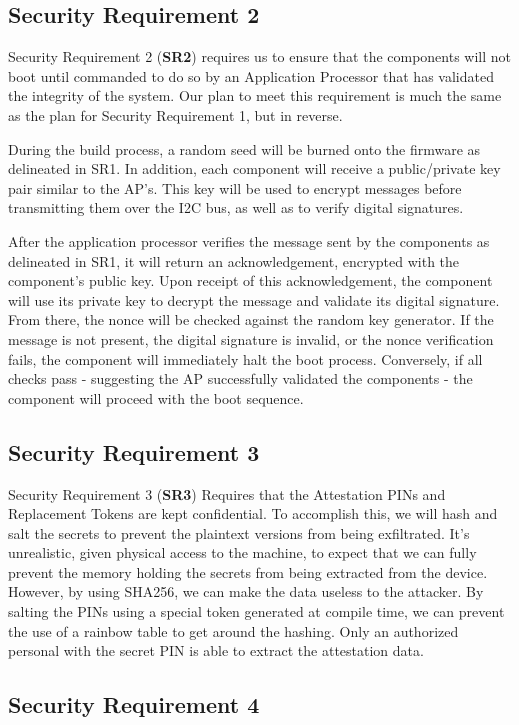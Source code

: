 \documentclass{prace}
\begin{document}
\subsection{Security Requirement 2}
Security Requirement 2 (\textbf{SR2}) requires us to ensure that the components will not boot until commanded
to do so by an Application Processor that has validated the integrity of the system. Our plan to
meet this requirement is much the same as the plan for Security Requirement 1, but in reverse.

During the build process, a random seed will be burned onto the firmware as delineated in 
SR1. In addition, each component will receive a public/private key pair similar to the AP's.
This key will be used to encrypt messages before transmitting them over the I2C bus, as well
as to verify digital signatures.

After the application processor verifies the message sent by the components as delineated
in SR1, it will return an acknowledgement, encrypted with the component's public key. Upon
receipt of this acknowledgement, the component will use its private key to decrypt the 
message and validate its digital signature. From there, the nonce will be checked against
the random key generator. If the message is not present, the digital signature is invalid,
or the nonce verification fails, the component will immediately halt the boot process.
Conversely, if all checks pass - suggesting the AP successfully validated the components -
the component will proceed with the boot sequence.

\subsection{Security Requirement 3}

Security Requirement 3 (\textbf{SR3}) Requires that the Attestation PINs and Replacement Tokens are kept confidential.
To accomplish this, we will hash and salt the secrets to prevent the plaintext versions from being exfiltrated.
It's unrealistic, given physical access to the machine, to expect that we can fully prevent the memory holding
the secrets from being extracted from the device. However, by using SHA256, we can make the data useless to the
attacker. By salting the PINs using a special token generated at compile time, we can prevent the use of a rainbow
table to get around the hashing. Only an authorized personal with the secret PIN is able to extract the attestation data.


\subsection{Security Requirement 4}
\end{document}
